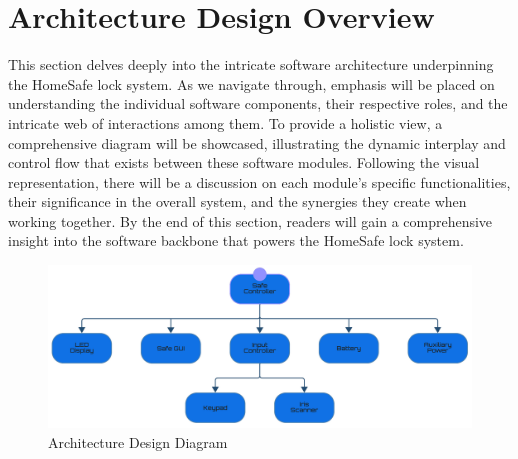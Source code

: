 \documentclass{article}
\begin{document}
\section{Architecture Design Overview}
This section delves deeply into the intricate software architecture underpinning the HomeSafe lock system. As we navigate through, emphasis will be placed on understanding the individual software components, their respective roles, and the intricate web of interactions among them. To provide a holistic view, a comprehensive diagram will be showcased, illustrating the dynamic interplay and control flow that exists between these software modules. Following the visual representation, there will be a discussion on each module's specific functionalities, their significance in the overall system, and the synergies they create when working together. By the end of this section, readers will gain a comprehensive insight into the software backbone that powers the HomeSafe lock system.

\begin{figure}[h]
    \centering
    \includegraphics[scale=0.32]{docs/figs/architecture_design.png}
    \caption{Architecture Design Diagram \cite{lucidLucidVisual}}
    \label{fig:diagram1}
\end{figure}
\end{document}

